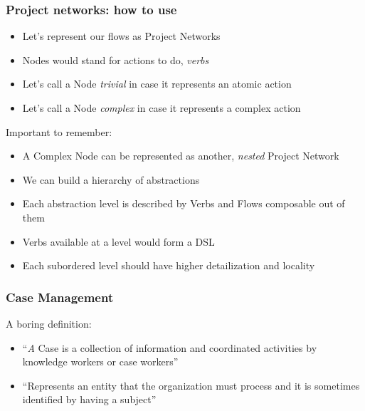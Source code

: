 \documentclass{beamer}
\begin{document}
\begin{frame}
    \frametitle{Project networks: how to use}
    \begin{itemize}
        \item Let's represent our flows as Project Networks
        \item Nodes would stand for actions to do, \textit{verbs}
        \item Let's call a Node \textit{trivial} in case it represents an atomic action
        \item Let's call a Node \textit{complex} in case it represents a complex action
    \end{itemize}
Important to remember:
    \begin{itemize}
        \item A Complex Node can be represented as another, \textit{nested} Project Network
        \item We can build a hierarchy of abstractions
        \item Each abstraction level is described by Verbs and Flows composable out of them
        \item Verbs available at a level would form a DSL
        \item Each subordered level should have higher detailization and locality
    \end{itemize}
\end{frame}

\begin{frame}
    \frametitle{Case Management}
    A boring definition:
    
    \begin{itemize}
        \item ``\textit A {Case} is a collection of information and coordinated activities by knowledge workers or case workers''
        \item ``Represents an entity that the organization must process and it is sometimes identified by having a subject''
    \end{itemize}
\end{frame}
\end{document}

